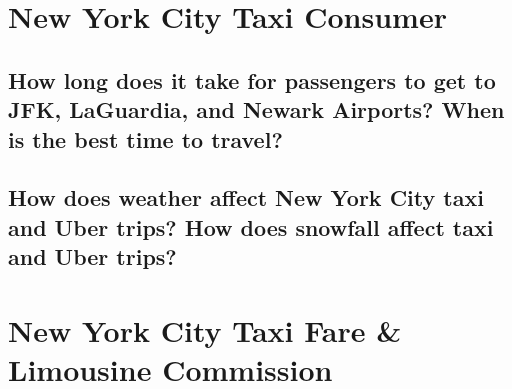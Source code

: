 \documentclass[12pt,twoside]{reedthesis}
\newenvironment{Shaded}{\begin{snugshade}}{\end{snugshade}}
\newcommand{\KeywordTok}[1]{\textcolor[rgb]{0.13,0.29,0.53}{\textbf{#1}}}
\newcommand{\DecValTok}[1]{\textcolor[rgb]{0.00,0.00,0.81}{#1}}
\newcommand{\FloatTok}[1]{\textcolor[rgb]{0.00,0.00,0.81}{#1}}
\newcommand{\StringTok}[1]{\textcolor[rgb]{0.31,0.60,0.02}{#1}}
\newcommand{\OperatorTok}[1]{\textcolor[rgb]{0.81,0.36,0.00}{\textbf{#1}}}
\newcommand{\NormalTok}[1]{#1}
\theoremstyle{definition}
\theoremstyle{definition}
\theoremstyle{definition}
\theoremstyle{remark}
\begin{document}
\chapter{New York City Taxi Consumer}\label{chapter3}

\section{How long does it take for passengers to get to JFK, LaGuardia,
and Newark Airports? When is the best time to
travel?}\label{how-long-does-it-take-for-passengers-to-get-to-jfk-laguardia-and-newark-airports-when-is-the-best-time-to-travel}
\begin{Shaded}
\end{Shaded}
\begin{Shaded}
\end{Shaded}
\section{How does weather affect New York City taxi and Uber trips? How
does snowfall affect taxi and Uber
trips?}\label{how-does-weather-affect-new-york-city-taxi-and-uber-trips-how-does-snowfall-affect-taxi-and-uber-trips}

\chapter{New York City Taxi Fare \& Limousine
Commission}\label{chapter4}
\end{document}

